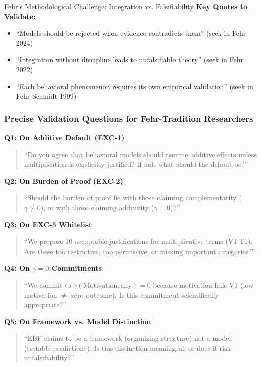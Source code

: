\begin{chapter}{Fehr's Methodological Challenge: Integration vs. Falsifiability}
\textbf{Key Quotes to Validate:}
\begin{itemize}[noitemsep]
    \item ``Models should be rejected when evidence contradicts them'' (seek in Fehr 2024)
    \item ``Integration without discipline leads to unfalsifiable theory'' (seek in Fehr 2022)
    \item ``Each behavioral phenomenon requires its own empirical validation'' (seek in Fehr-Schmidt 1999)
\end{itemize}

\subsubsection{Precise Validation Questions for Fehr-Tradition Researchers}

\begin{tcolorbox}[colback=orange!5!white,colframe=orange!75!black,title=\textbf{Structured Interview Protocol}]
\textbf{Q1: On Additive Default (EXC-1)}
\begin{quote}
``Do you agree that behavioral models should assume additive effects unless multiplication is explicitly justified? If not, what should the default be?''
\end{quote}

\textbf{Q2: On Burden of Proof (EXC-2)}
\begin{quote}
``Should the burden of proof lie with those claiming complementarity ($\gamma \neq 0$), or with those claiming additivity ($\gamma = 0$)?''
\end{quote}

\textbf{Q3: On EXC-5 Whitelist}
\begin{quote}
``We propose 10 acceptable justifications for multiplicative terms (V1-T1). Are these too restrictive, too permissive, or missing important categories?''
\end{quote}

\textbf{Q4: On $\gamma = 0$ Commitments}
\begin{quote}
``We commit to $\gamma(\text{Motivation}, \text{any}) = 0$ because motivation fails V1 (low motivation $\neq$ zero outcome). Is this commitment scientifically appropriate?''
\end{quote}

\textbf{Q5: On Framework vs. Model Distinction}
\begin{quote}
``EBF claims to be a framework (organizing structure) not a model (testable predictions). Is this distinction meaningful, or does it risk unfalsifiability?''
\end{quote}


\end{tcolorbox}
\end{chapter}
